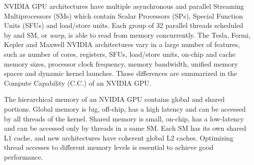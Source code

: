 NVIDIA GPU architectures have multiple asynchronous and parallel Streaming
Multiprocessors (SMs) which contain Scalar Processors (SPs), Special Function
Units (SFUs) and load/store units. Each group of 32 parallel threads scheduled
by and SM, or \textit{warp}, is able to read from memory concurrently.  The
Tesla, Fermi, Kepler and Maxwell NVIDIA architectures vary in a large number of
features, such as number of cores, registers, SFUs, load/store units, on-chip
and cache memory sizes, processor clock frequency, memory bandwidth, unified
memory spaces and dynamic kernel launches.  Those differences are summarized in
the Compute Capability (C.C.) of an NVIDIA GPU.


The hierarchical memory of an NVIDIA GPU contains global and shared portions.
Global memory is big, off-chip, has a high latency and can be accessed by all
threads of the kernel.  Shared memory is small, on-chip, has a low-latency and
can be accessed only by threads in a same SM.  Each SM has its own shared L1
cache, and new architectures have coherent global L2 caches.  Optimizing thread
accesses to different memory levels is essential to achieve good performance.


